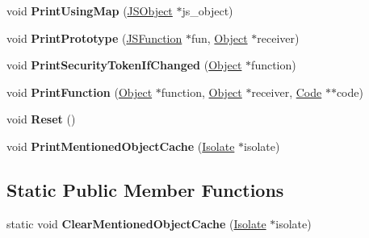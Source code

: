 \begin{DoxyCompactItemize}
\item 
void {\bfseries Print\+Using\+Map} (\hyperlink{classv8_1_1internal_1_1_j_s_object}{J\+S\+Object} $\ast$js\+\_\+object)\hypertarget{classv8_1_1internal_1_1_string_stream_a18dafcb71cb03dfab099345894be47f4}{}\label{classv8_1_1internal_1_1_string_stream_a18dafcb71cb03dfab099345894be47f4}

\item 
void {\bfseries Print\+Prototype} (\hyperlink{classv8_1_1internal_1_1_j_s_function}{J\+S\+Function} $\ast$fun, \hyperlink{classv8_1_1internal_1_1_object}{Object} $\ast$receiver)\hypertarget{classv8_1_1internal_1_1_string_stream_afb484ceb6ccf40f9d9194bfdb68edd4e}{}\label{classv8_1_1internal_1_1_string_stream_afb484ceb6ccf40f9d9194bfdb68edd4e}

\item 
void {\bfseries Print\+Security\+Token\+If\+Changed} (\hyperlink{classv8_1_1internal_1_1_object}{Object} $\ast$function)\hypertarget{classv8_1_1internal_1_1_string_stream_aa03d85843946a62a1c0b31a82e7d9a3f}{}\label{classv8_1_1internal_1_1_string_stream_aa03d85843946a62a1c0b31a82e7d9a3f}

\item 
void {\bfseries Print\+Function} (\hyperlink{classv8_1_1internal_1_1_object}{Object} $\ast$function, \hyperlink{classv8_1_1internal_1_1_object}{Object} $\ast$receiver, \hyperlink{classv8_1_1internal_1_1_code}{Code} $\ast$$\ast$code)\hypertarget{classv8_1_1internal_1_1_string_stream_a1c4ec40d3c8ee4f55b0b6e3b8ce3521b}{}\label{classv8_1_1internal_1_1_string_stream_a1c4ec40d3c8ee4f55b0b6e3b8ce3521b}

\item 
void {\bfseries Reset} ()\hypertarget{classv8_1_1internal_1_1_string_stream_ac124b401d3e5678944c1377ee936f8d0}{}\label{classv8_1_1internal_1_1_string_stream_ac124b401d3e5678944c1377ee936f8d0}

\item 
void {\bfseries Print\+Mentioned\+Object\+Cache} (\hyperlink{classv8_1_1internal_1_1_isolate}{Isolate} $\ast$isolate)\hypertarget{classv8_1_1internal_1_1_string_stream_a623085f254cf314be127bdd1e23641a7}{}\label{classv8_1_1internal_1_1_string_stream_a623085f254cf314be127bdd1e23641a7}

\end{DoxyCompactItemize}
\subsection*{Static Public Member Functions}
\begin{DoxyCompactItemize}
\item 
static void {\bfseries Clear\+Mentioned\+Object\+Cache} (\hyperlink{classv8_1_1internal_1_1_isolate}{Isolate} $\ast$isolate)\hypertarget{classv8_1_1internal_1_1_string_stream_a51afd68ec786821ea978e5855e9afe62}{}\label{classv8_1_1internal_1_1_string_stream_a51afd68ec786821ea978e5855e9afe62}

\end{DoxyCompactItemize}

